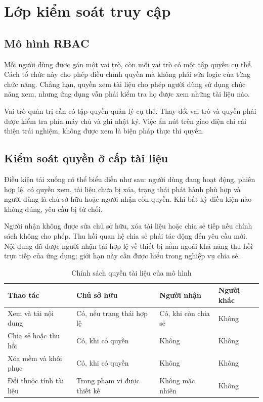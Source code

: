 \section{Lớp kiểm soát truy cập}
\subsection{Mô hình RBAC}
Mỗi người dùng được gán một vai trò, còn mỗi vai trò có một tập quyền cụ thể. Cách tổ chức này cho phép điều chỉnh quyền mà không phải sửa logic của từng chức năng. Chẳng hạn, quyền xem tài liệu cho phép người dùng sử dụng chức năng xem, nhưng ứng dụng vẫn phải kiểm tra họ được xem những tài liệu nào.

Vai trò quản trị cần có tập quyền quản lý cụ thể. Thay đổi vai trò và quyền phải được kiểm tra phía máy chủ và ghi nhật ký. Việc ẩn nút trên giao diện chỉ cải thiện trải nghiệm, không được xem là biện pháp thực thi quyền.
\subsection{Kiểm soát quyền ở cấp tài liệu}
Điều kiện tải xuống có thể biểu diễn như sau: người dùng đang hoạt động, phiên hợp lệ, có quyền xem, tài liệu chưa bị xóa, trạng thái phát hành phù hợp và người dùng là chủ sở hữu hoặc người nhận còn quyền. Khi bất kỳ điều kiện nào không đúng, yêu cầu bị từ chối.

Người nhận không được sửa chủ sở hữu, xóa tài liệu hoặc chia sẻ tiếp nếu chính sách không cho phép. Thu hồi quan hệ chia sẻ phải tác động đến yêu cầu mới. Nội dung đã được người nhận tải hợp lệ về thiết bị nằm ngoài khả năng thu hồi trực tiếp của ứng dụng; giới hạn này cần được hiểu trong nghiệp vụ chia sẻ.
\begin{table}[htbp]\centering\small
\caption{Chính sách quyền tài liệu của mô hình}
\begin{tabularx}{\textwidth}{P{3.3cm}XXX}\toprule
\textbf{Thao tác}&\textbf{Chủ sở hữu}&\textbf{Người nhận}&\textbf{Người khác}\\\midrule
Xem và tải nội dung & Có, nếu trạng thái hợp lệ & Có, khi còn chia sẻ & Không\\
Chia sẻ hoặc thu hồi & Có, khi có quyền & Không & Không\\
Xóa mềm và khôi phục & Có, khi có quyền & Không & Không\\
Đổi thuộc tính tài liệu & Trong phạm vi được thiết kế & Không mặc nhiên & Không\\\bottomrule
\end{tabularx}\end{table}
